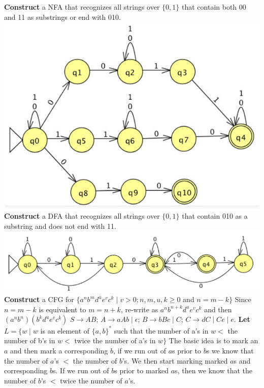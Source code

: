 \documentclass[9pt]{article}
\begin{document}
\begin{multicols*}{2}
    \noindent \textbf{Construct} a NFA that recognizes all strings over $\{0,1\}$ that contain both 00 and 11 as substrings or end with 010.\newline
    \includegraphics[scale=0.34]{q3_1}\newline
    \textbf{Construct} a DFA that recognizes all strings over $\{0, 1\}$ that contain 010 as a substring and does not end with 11.\newline
    \includegraphics[scale=0.4]{q4_1}\newline
    \textbf{Construct} a CFG for $\{a^nb^md^ue^vc^k\mid v > 0; n, m, u, k\geq 0 $ and $n=m-k\}$\newline
    Since $n=m-k$ is equivalent to $m=n+k$, re-write as $a^nb^{n+k}d^ue^vc^k$ and then $(a^nb^n)(b^{k}d^ue^vc^k)$\newline
    $S\rightarrow AB$; $A\rightarrow aAb\mid \epsilon$; $B\rightarrow bBc\mid C$; $C\rightarrow dC\mid Ce\mid e$.\newline
    \textbf{Let} $L=\{w\mid w$ is an element of $\{a,b\}^*$ such that the number of a's in $w<$ the number of b's in $w<$ twice the number of a's in $w\}$\newline
    The basic idea is to mark an $a$ and then mark a corresponding $b$, if we run out of $a$s prior to $b$s we know that the number of $a$'s $<$ the number of $b$'s. We then start marking marked $a$s and corresponding $b$s. If we run out of $b$s prior to marked $a$s, then we know that the number of $b$'s $<$ twice the number of $a$'s.\newline

\end{multicols*}
\end{document}
